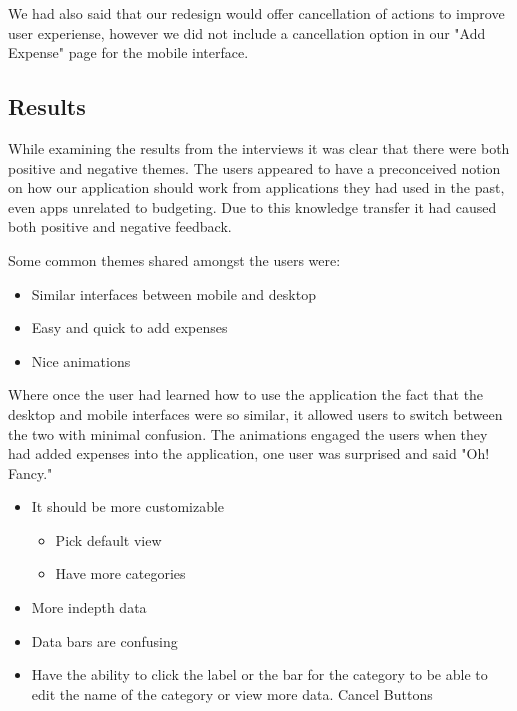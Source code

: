 \documentclass{chi2011}
\begin{document}
	We had also said that our redesign would offer cancellation of actions to improve user experiense,
	however we did not include a cancellation option in our "Add Expense" page for the mobile interface.

	\subsection{Results}

	While examining the results from the interviews it was clear that there were both positive and 
	negative themes. The users appeared to have a preconceived notion on how our application should
	work from applications they had used in the past, even apps unrelated to budgeting. Due to this
	knowledge transfer it had caused both positive and negative feedback. 
	
	Some common themes shared amongst the users were:
	\begin{itemize}[noitemsep]
		\item Similar interfaces between mobile and desktop
		\item Easy and quick to add expenses
		\item Nice animations
	\end{itemize}
	Where once the user had learned how to use the application the fact that the desktop and mobile
	interfaces were so similar, it allowed users to switch between the two with minimal confusion. 
	The animations engaged the users when they had added expenses into the application, one user
	was surprised and said "Oh! Fancy." 
	
	\begin{itemize}[noitemsep]
		\item It should be more customizable
		\begin{itemize}[noitemsep]
			\item Pick default view
			\item Have more categories
		\end{itemize}
		\item More indepth data 
		\item Data bars are confusing
		\item Have the ability to click the label or the bar for the category to be able to edit 
		the name of the category or view more data. Cancel Buttons
	\end{itemize}
	
\end{document}
